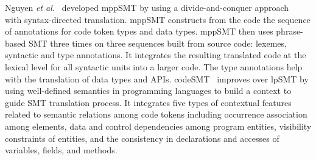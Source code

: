 Nguyen {\em et al.}~\cite{ase15} developed mppSMT by using a
divide-and-conquer approach~\cite{sudoh15} with syntax-directed
translation. mppSMT constructs from the code the sequence of
annotations for code token types and data types. mppSMT then uses
phrase-based SMT three times on three sequences built from source
code: lexemes, syntactic and type annotations. It integrates the
resulting translated code at the lexical level for all syntactic units
into a larger code. The type annotations help with the translation of
data types and APIs.
%
codeSMT~\cite{icsme16} improves over lpSMT by using well-defined
semantics in programming languages to build a context to guide SMT
translation process. It integrates five types of contextual features
related to semantic relations among code tokens including
occurrence association among elements, data and control
dependencies among program entities, visibility constraints of
entities, and the consistency in declarations and accesses of
variables, fields, and methods.







